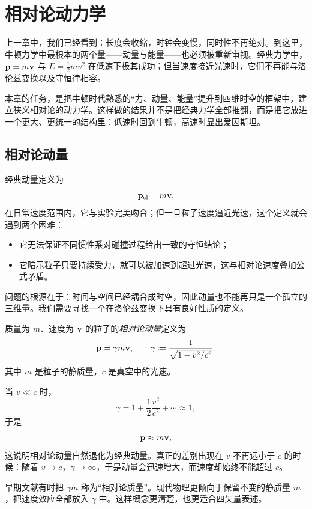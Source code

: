 \chapter{相对论动力学}

上一章中，我们已经看到：长度会收缩，时钟会变慢，同时性不再绝对。到这里，牛顿力学中最根本的两个量——动量与能量——也必须被重新审视。经典力学中，$\vb{p}=m\vb{v}$ 与 $E=\tfrac12 mv^2$ 在低速下极其成功；但当速度接近光速时，它们不再能与洛伦兹变换以及守恒律相容。

本章的任务，是把牛顿时代熟悉的“力、动量、能量”提升到四维时空的框架中，建立狭义相对论的动力学。这样做的结果并不是把经典力学全部推翻，而是把它放进一个更大、更统一的结构里：低速时回到牛顿，高速时显出爱因斯坦。

\section{相对论动量}

经典动量定义为
\[
\vb{p}_{\text{cl}}=m\vb{v}.
\]
在日常速度范围内，它与实验完美吻合；但一旦粒子速度逼近光速，这个定义就会遇到两个困难：
\begin{itemize}
  \item 它无法保证不同惯性系对碰撞过程给出一致的守恒结论；
  \item 它暗示粒子只要持续受力，就可以被加速到超过光速，这与相对论速度叠加公式矛盾。
\end{itemize}

问题的根源在于：时间与空间已经耦合成时空，因此动量也不能再只是一个孤立的三维量。我们需要寻找一个在洛伦兹变换下具有良好性质的定义。

\begin{definition}[相对论动量]
质量为 $m$、速度为 $\vb{v}$ 的粒子的\emph{相对论动量}定义为
\[
\vb{p}=\gamma m\vb{v},
\qquad
\gamma\coloneqq \frac{1}{\sqrt{1-v^2/c^2}}.
\]
其中 $m$ 是粒子的静质量，$c$ 是真空中的光速。
\end{definition}

当 $v\ll c$ 时，
\[
\gamma = 1 + \frac12\frac{v^2}{c^2}+\cdots \approx 1,
\]
于是
\[
\vb{p}\approx m\vb{v},
\]
这说明相对论动量自然退化为经典动量。真正的差别出现在 $v$ 不再远小于 $c$ 的时候：随着 $v\to c$，$\gamma\to \infty$，于是动量会迅速增大，而速度却始终不能超过 $c$。

\begin{remark}
早期文献有时把 $\gamma m$ 称为“相对论质量”。现代物理更倾向于保留不变的静质量 $m$，把速度效应全部放入 $\gamma$ 中。这样概念更清楚，也更适合四矢量表述。
\end{remark}

